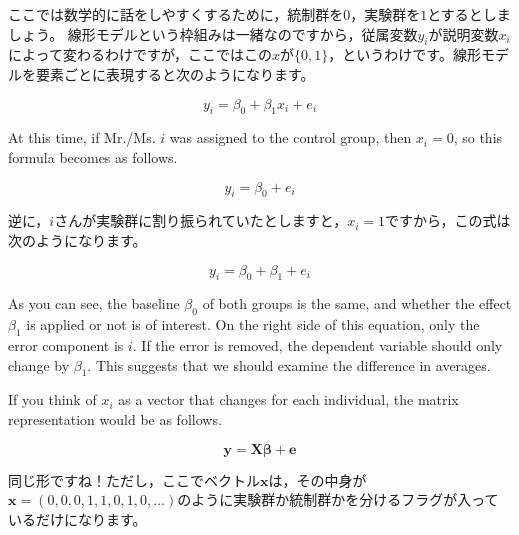 \documentclass{ltjsbook}
\begin{document}
ここでは数学的に話をしやすくするために，統制群を$0$，実験群を$1$とするとしましょう。
線形モデルという枠組みは一緒なのですから，従属変数$y_i$が説明変数$x_i$によって変わるわけですが，ここではこの$x$が$ \{ 0, 1 \}$，というわけです。線形モデルを要素ごとに表現すると次のようになります。

\[ y_i = \beta_0 + \beta_1 x_i + e_i \]

At this time, if Mr./Ms. $i$ was assigned to the control group, then $x_i=0$, so this formula becomes as follows.

\[ y_i = \beta_0 + e_i \]

逆に，$i$さんが実験群に割り振られていたとしますと，$x_i= 1$ですから，この式は次のようになります。

\[ y_i = \beta_0 + \beta_1 + e_i \]

As you can see, the baseline $\beta_0$ of both groups is the same, and whether the effect $\beta_1$ is applied or not is of interest. On the right side of this equation, only the error component is $i$. If the error is removed, the dependent variable should only change by $\beta_1$. This suggests that we should examine the difference in averages.

If you think of $x_i$ as a vector that changes for each individual, the matrix representation would be as follows.

\[ \bm{y} = \bm{X\beta} + \bm{e} \]

同じ形ですね！ただし，ここでベクトル$\bm{x}$は，その中身が$\bm{x} = ( 0,0,0,1,1,0,1,0,...)$のように実験群か統制群かを分けるフラグが入っているだけになります。
\end{document}
